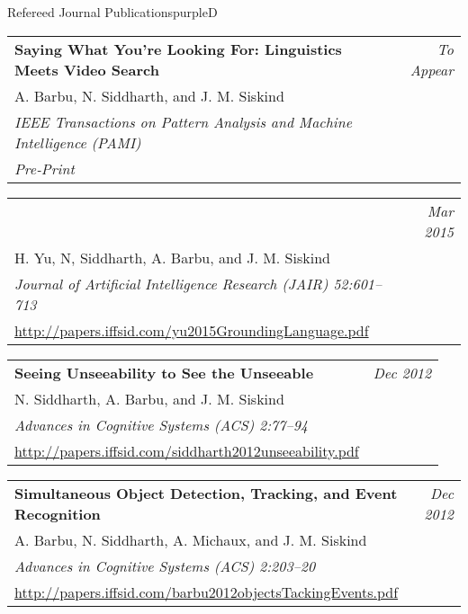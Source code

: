 \documentclass[a4paper]{article}
\makeatletter
\newlength{\itemtextwidth}
\newenvironment{publication}[5]
{ \item
  \begin{tabular*}{\itemtextwidth}{@{}p{5.6in}@{\extracolsep{\fill}}r@{}}
    \textbf{#1} & \textit{#2}\\ #3 &\\ \textit{#4}&\\ #5
  \end{tabular*}
  \vspace*{-2pt}
} {}
\def\item{\addtocounter{enumi}{-2}\oldItem}
\makeatother
\begin{document}
\begin{region}[J][4]{Refereed Journal Publications}{purpleD}
  \begin{publication} {Saying What You're Looking For: Linguistics Meets Video Search}
    {To Appear}
    {A. Barbu, N. Siddharth, and J. M. Siskind}
    {IEEE Transactions on Pattern Analysis and Machine Intelligence (PAMI) \hfill \emph{}}
    {\emph{Pre-Print}}
  \end{publication}
  \begin{publication} {A Compositional Framework for Grounding Language Inference, Generation,
      and\rule{6ex}{0pt} Acquisition in Video}
    {Mar 2015}
    {H. Yu, N, Siddharth, A. Barbu, and J. M. Siskind}
    {Journal of Artificial Intelligence Research (JAIR) \hfill \emph{52:601--713}}
    {\url{http://papers.iffsid.com/yu2015GroundingLanguage.pdf}\label{j:3}}
  \end{publication}
  \begin{publication} {Seeing Unseeability to See the Unseeable}
    {Dec 2012}
    {N. Siddharth, A. Barbu, and J. M. Siskind}
    {Advances in Cognitive Systems (ACS) \hfill \emph{2:77--94}}
    {\url{http://papers.iffsid.com/siddharth2012unseeability.pdf}\label{j:2}}
  \end{publication}
  \begin{publication} {Simultaneous Object Detection, Tracking, and Event Recognition}
    {Dec 2012}
    {A. Barbu, N. Siddharth, A. Michaux, and J. M. Siskind}
    {Advances in Cognitive Systems (ACS) \hfill \emph{2:203--20}}
    {\url{http://papers.iffsid.com/barbu2012objectsTackingEvents.pdf}\label{j:1}}
  \end{publication}
\end{region}
\end{document}
